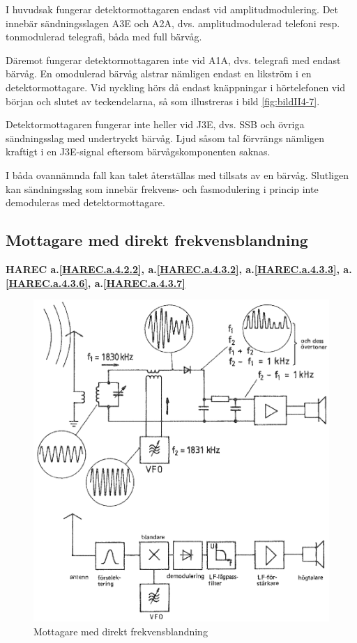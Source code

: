 I huvudsak fungerar detektormottagaren endast vid amplitudmodulering.
Det innebär sändningsslagen A3E och A2A, dvs. amplitudmodulerad telefoni
resp. tonmodulerad telegrafi, båda med full bärvåg.

Däremot fungerar detektormottagaren inte vid A1A, dvs. telegrafi med
endast bärvåg.
En omodulerad bärvåg alstrar nämligen endast en likström i en
detektormottagare.
Vid nyckling hörs då endast knäppningar i hörtelefonen vid början och
slutet av teckendelarna, så som illustreras i bild \ref{fig:bildII4-7}.

Detektormottagaren fungerar inte heller vid J3E, dvs. SSB och övriga
sändningsslag med undertryckt bärvåg.
Ljud såsom tal förvrängs nämligen kraftigt i en J3E-signal eftersom
bärvågskomponenten saknas.

I båda ovannämnda fall kan talet återställas med tillsats av en bärvåg.
Slutligen kan sändningsslag som innebär frekvens- och fasmodulering i
princip inte demoduleras med detektormottagare.

\subsection{Mottagare med direkt frekvensblandning}
\textbf{HAREC a.\ref{HAREC.a.4.2.2}\label{myHAREC.a.4.2.2},
a.\ref{HAREC.a.4.3.2}\label{myHAREC.a.4.3.2},
a.\ref{HAREC.a.4.3.3}\label{myHAREC.a.4.3.3},
a.\ref{HAREC.a.4.3.6}\label{myHAREC.a.4.3.6},
a.\ref{HAREC.a.4.3.7}\label{myHAREC.a.4.3.7}
}

\begin{figure}
  \includegraphics[width=\textwidth]{images/cropped_pdfs/bild_2_4-08.pdf}
  \caption{Mottagare med direkt frekvensblandning}
  \label{fig:bildII4-8}
\end{figure}

